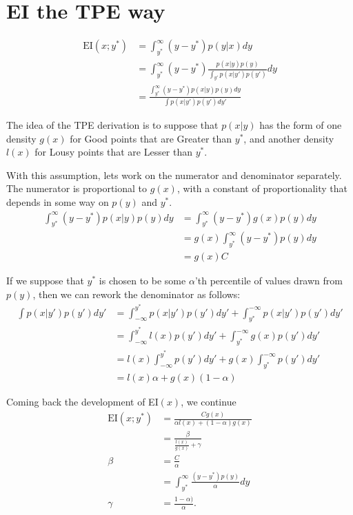 \documentclass{article}
\begin{document}
\section{EI the TPE way}

\begin{align}
    \mathrm{EI}(x; y^{*}) &= \int_{y^{*}}^{\infty} (y - y^{*})p(y|x) dy \\
    &= \int_{y^{*}}^{\infty} (y - y^{*})\frac{p(x|y)p(y)}{\int_{y'}p(x|y')p(y')} dy \\
    &= \frac{\int_{y^{*}}^{\infty} (y - y^{*})p(x|y)p(y) dy}{\int p(x|y')p(y') {dy'}}
\end{align}

The idea of the TPE derivation is to suppose that
$p(x|y)$ has the form of one density $g(x)$ for Good points that are Greater than $y^*$, and
another density $l(x)$ for Lousy points that are Lesser than $y^*$.

With this assumption, lets work on the numerator and denominator separately.
The numerator is proportional to $g(x)$, with a constant of proportionality that depends in some way on $p(y)$ and $y^*$.
\begin{align}
    \int_{y^{*}}^{\infty} (y - y^{*})p(x|y)p(y) dy
    &= \int_{y^{*}}^{\infty} (y - y^{*})g(x)p(y) dy \\
    &= g(x)\int_{y^{*}}^{\infty} (y - y^{*})p(y) dy \\
    &= g(x) C
\end{align}

If we suppose that $y^*$ is chosen to be some $\alpha$'th percentile of values drawn from $p(y)$, then we can rework the denominator as follows:
\begin{align}
    \int p(x|y')p(y') {dy'}
    &= \int_{-\infty}^{y^*}p(x|y')p(y') dy' + \int_{y^*}^{-\infty}p(x|y')p(y') dy' \\
    &= \int_{-\infty}^{y^*}l(x)p(y') dy' + \int_{y^*}^{-\infty}g(x)p(y') dy' \\
    &= l(x)\int_{-\infty}^{y^*}p(y') dy' + g(x)\int_{y^*}^{-\infty}p(y') dy' \\
    &= l(x) \alpha + g(x)(1 - \alpha)
\end{align}

Coming back the development of EI$(x)$, we continue
\begin{align}
\mathrm{EI}(x; y^{*})
    &= \frac{Cg(x)}{\alpha l(x) + (1 - \alpha) g(x)} \\
    &= \frac{\beta}{\frac{l(x)}{g(x)} + \gamma} \\
\beta 
    &= \frac{C}{\alpha} \\
    &= \int_{y^{*}}^{\infty} \frac{(y - y^{*})p(y)}{\alpha} dy \\
\gamma
    &= \frac{1 - \alpha)}{\alpha}.
\end{align}
\end{document}
